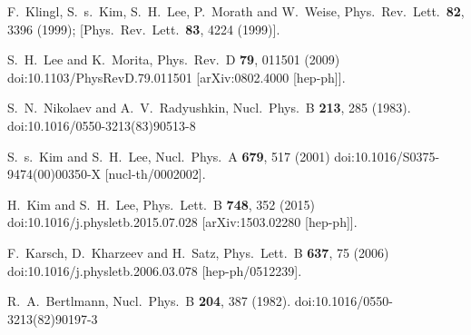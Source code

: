 \documentclass[aps,prc,superscriptaddress,showpacs,floatfix, nofootinbib,preprintnumbers,twocolumn]{revtex4}
\begin{document}
\begin{thebibliography}{50}
  F.~Klingl, S.~s.~Kim, S.~H.~Lee, P.~Morath and W.~Weise,
  Phys.\ Rev.\ Lett.\  {\bf 82}, 3396 (1999);
  [Phys.\ Rev.\ Lett.\  {\bf 83}, 4224 (1999)].

  S.~H.~Lee and K.~Morita,
  Phys.\ Rev.\ D {\bf 79}, 011501 (2009)
  doi:10.1103/PhysRevD.79.011501
  [arXiv:0802.4000 [hep-ph]].


  S.~N.~Nikolaev and A.~V.~Radyushkin,
  Nucl.\ Phys.\ B {\bf 213}, 285 (1983).
  doi:10.1016/0550-3213(83)90513-8

  
  S.~s.~Kim and S.~H.~Lee,
  Nucl.\ Phys.\ A {\bf 679}, 517 (2001)
  doi:10.1016/S0375-9474(00)00350-X
  [nucl-th/0002002].
  
  H.~Kim and S.~H.~Lee,
  Phys.\ Lett.\ B {\bf 748}, 352 (2015)
  doi:10.1016/j.physletb.2015.07.028
  [arXiv:1503.02280 [hep-ph]].




  

  
  F.~Karsch, D.~Kharzeev and H.~Satz,
  Phys.\ Lett.\ B {\bf 637}, 75 (2006)
  doi:10.1016/j.physletb.2006.03.078
  [hep-ph/0512239].
  
  R.~A.~Bertlmann,
  Nucl.\ Phys.\ B {\bf 204}, 387 (1982).
  doi:10.1016/0550-3213(82)90197-3

  

\end{thebibliography}
\end{document}
